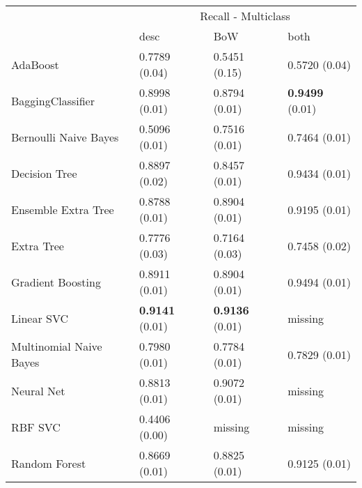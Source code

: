 \begin{tabular}{|l|l|l|l| }
\hline
 &  \multicolumn{3}{c|}{ Recall - Multiclass} \\
\cline{2-4} & desc & BoW & both \\ \hline
AdaBoost                & 0.7789 (0.04) & 0.5451 (0.15) & 0.5720 (0.04)\\
BaggingClassifier       & 0.8998 (0.01) & 0.8794 (0.01) & {\bf 0.9499} (0.01)\\
Bernoulli Naive Bayes   & 0.5096 (0.01) & 0.7516 (0.01) & 0.7464 (0.01)\\
Decision Tree           & 0.8897 (0.02) & 0.8457 (0.01) & 0.9434 (0.01)\\
Ensemble Extra Tree     & 0.8788 (0.01) & 0.8904 (0.01) & 0.9195 (0.01)\\
Extra Tree              & 0.7776 (0.03) & 0.7164 (0.03) & 0.7458 (0.02)\\
Gradient Boosting       & 0.8911 (0.01) & 0.8904 (0.01) & 0.9494 (0.01)\\
Linear SVC              & {\bf 0.9141} (0.01) & {\bf 0.9136} (0.01) & missing \\
Multinomial Naive Bayes & 0.7980 (0.01) & 0.7784 (0.01) & 0.7829 (0.01)\\
Neural Net              & 0.8813 (0.01) & 0.9072 (0.01) & missing \\
RBF SVC                 & 0.4406 (0.00) & missing  & missing \\
Random Forest           & 0.8669 (0.01) & 0.8825 (0.01) & 0.9125 (0.01)\\
\hline
\end{tabular}